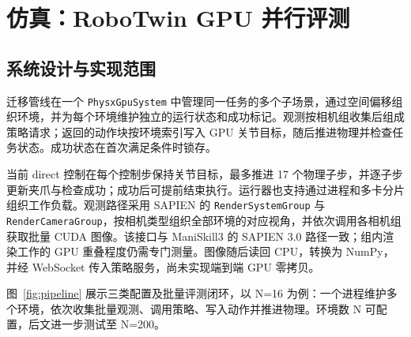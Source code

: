 \documentclass{article}
\begin{document}
\section{仿真：RoboTwin GPU 并行评测}
\subsection{系统设计与实现范围}
迁移管线在一个 \texttt{PhysxGpuSystem} 中管理同一任务的多个子场景，通过空间偏移组织环境，并为每个环境维护独立的运行状态和成功标记。观测按相机组收集后组成策略请求；返回的动作块按环境索引写入 GPU 关节目标，随后推进物理并检查任务状态。成功状态在首次满足条件时锁存。

当前 direct 控制在每个控制步保持关节目标，最多推进 17 个物理子步，并逐子步更新夹爪与检查成功；成功后可提前结束执行。运行器也支持通过进程和多卡分片组织工作负载。观测路径采用 SAPIEN 的 \texttt{RenderSystemGroup} 与 \texttt{RenderCameraGroup}，按相机类型组织全部环境的对应视角，并依次调用各相机组获取批量 CUDA 图像。该接口与 ManiSkill3 的 SAPIEN 3.0 路径一致；组内渲染工作的 GPU 重叠程度仍需专门测量。图像随后读回 CPU，转换为 NumPy，并经 WebSocket 传入策略服务，尚未实现端到端 GPU 零拷贝。

图~\ref{fig:pipeline} 展示三类配置及批量评测闭环，以 N=16 为例：一个进程维护多个环境，依次收集批量观测、调用策略、写入动作并推进物理。环境数 N 可配置，后文进一步测试至 N=200。
\end{document}
